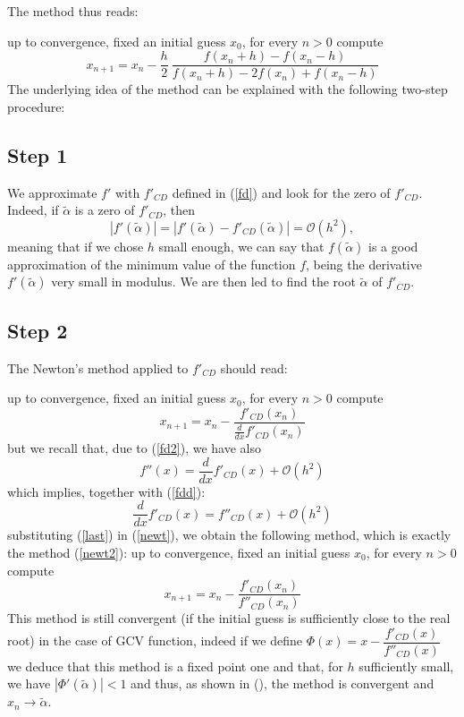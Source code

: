 \documentclass[a4paper,11 pt]{report}
\theoremstyle{plain}
\theoremstyle{definition}
\theoremstyle{remark}
\begin{document}
The method thus reads:

up to convergence, fixed an initial guess $x_0$, for every $n>0$ compute
\begin{equation}
x_{n+1}=x_n-\frac{h}{2}\ \dfrac{f(x_n+h)-f(x_n-h)}{f(x_n+h)-2f(x_n)+f(x_n-h)}
\label{newt2}
\end{equation}
The underlying idea of the method can be explained with the following two-step procedure: 
\subsection*{Step 1}
We approximate $f'$ with $f'_{CD}$ defined in (\ref{fd}) and look for the zero of $f'_{CD}$. Indeed, if $\tilde{\alpha}$ is a zero of $f'_{CD}$, then 
\begin{equation*}
|f'(\tilde{\alpha})|= |f'(\tilde{\alpha})-f'_{CD}(\tilde{\alpha})|=\mathcal{O}(h^2),
\end{equation*} 
meaning that if we chose $h$ small enough, we can say that $f(\tilde{\alpha})$ is a good approximation of the minimum value of the function $f$, being the derivative $f'(\tilde{\alpha})$ very small in modulus. 
We are then led to find the root $\tilde{\alpha}$ of $f'_{CD}$.
\subsection{Step 2}
The Newton's method applied to $f'_{CD}$ should read:


up to convergence, fixed an initial guess $x_0$, for every $n>0$ compute
\begin{equation}
x_{n+1}=x_n-\dfrac{f'_{CD}(x_n)}{\frac{d}{dx}f'_{CD}(x_n)}
\label{newt}
\end{equation}
but we recall that, due to (\ref{fd2}), we have also
\begin{equation}
f''(x)=\frac{d}{dx}f'_{CD}(x)+\mathcal{O}(h^2)
\label{eq}
\end{equation}
which implies, together with (\ref{fdd}):
\begin{equation}
\frac{d}{dx}f'_{CD}(x)=f''_{CD}(x)+\mathcal{O}(h^2)
\label{last}
\end{equation} 
substituting (\ref{last}) in (\ref{newt}), we obtain the following method, which is exactly the method (\ref{newt2}):
up to convergence, fixed an initial guess $x_0$, for every $n>0$ compute
\begin{equation}
x_{n+1}=x_n-\dfrac{f'_{CD}(x_n)}{f''_{CD}(x_n)}
\label{newt3}
\end{equation}
This method is still convergent (if the initial guess is sufficiently close to the real root) in the case of GCV function, indeed if we define 
$\Phi(x)=x-\dfrac{f'_{CD}(x)}{f''_{CD}(x)}$ we deduce that this method is a fixed point one and that, for $h$ sufficiently small, we have $|\Phi'(\tilde{\alpha})|<1$ and thus, as shown in (\cite{QSS}), the method is convergent and $x_n\rightarrow\tilde{\alpha}$. 
\end{document}
